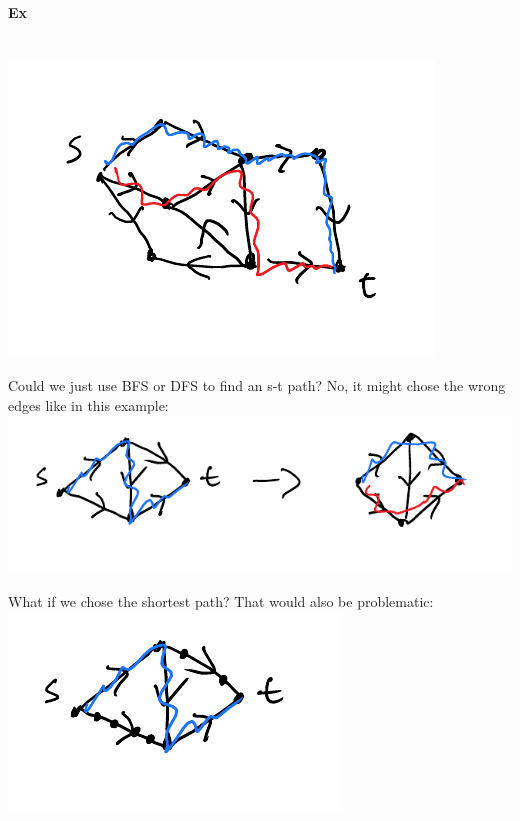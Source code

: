 \documentclass[12 pt]{article}
\begin{document}
        \paragraph{Ex}~
        \\ \includegraphics[width=.9\textwidth]{i67.pdf}

        Could we just use BFS or DFS to find an s-t path? No, it
        might chose the wrong edges like in this example:
        \\ \includegraphics[width=.9\textwidth]{i68.pdf}

        What if we chose the shortest path? That would also be
        problematic:
        \\ \includegraphics[width=.9\textwidth]{i69.pdf}
\end{document}
